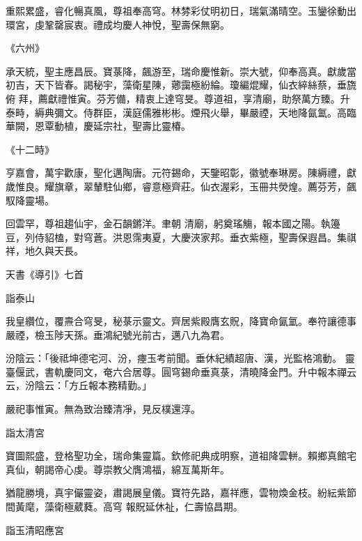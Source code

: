 \begin{pinyinscope}
 重熙累盛，睿化暢真風，尊祖奉高穹。林棼彩仗明初日，瑞氣滿晴空。玉鑾徐動出環宮，虔鞏罄宸衷。禮成均慶人神悅，聖壽保無窮。



 《六州》



 承天統，聖主應昌辰。寶菉降，飆游至，瑞命慶惟新。崇大號，仰奉高真。獻歲當初吉，天下皆春。謁秘宇，藻衛星陳，薌靄極紛綸。瓊編焜耀，仙衣綷絲蔡，垂旒俯
 拜，薦獻禮惟寅。芬芳備，精衷上達穹旻。尊道祖，享清廟，助祭萬方臻。升泰畤，縟典彌文。侍群臣，漢庭儒雅彬彬。煙飛火舉，畢嚴禋，天地降氤氳。高臨華闕，恩覃動植，慶延宗社，聖壽比靈椿。



 《十二時》



 亨嘉會，萬宇歡康，聖化邁陶唐。元符錫命，天鑒昭彰，徽號奉琳房。陳縟禮，獻歲惟良。耀旗章，翠輦駐仙鄉，睿意極齊莊。仙衣渥彩，玉冊共熒煌。薦芬芳，飆馭降靈場。



 回雲罕，尊祖趨仙宇，金石韻鏘洋。聿朝
 清廟，躬奠瑤觴，報本國之陽。執籩豆，列侍貂榼，對穹蒼。洪恩霈夷夏，大慶浹家邦。垂衣紫極，聖壽保遐昌。集祺祥，地久與天長。



 天書《導引》七首



 詣泰山



 我皇纘位，覆燾合穹旻，秘菉示靈文。齊居紫殿膺玄貺，降寶命氤氳。奉符讓德事嚴禋，檢玉陟天孫。垂鴻紀號光前古，邁八九為君。



 汾陰云：「後祗坤德宅河、汾，瘞玉考前聞。垂休紀績超唐、漢，光監格鴻動。
 靈臺偃武，書軌慶同文，奄六合居尊。圓穹錫命垂真菉，清曉降金門。升中報本禪云云，汾陰云：「方丘報本務精勤。」



 嚴祀事惟寅。無為致治臻清凈，見反樸還淳。



 詣太清宮



 寶圖熙盛，登格聖功全，瑞命集靈篇。欽修祀典成明察，道祖降雲軿。賴鄉真館宅真仙，朝謁帝心虔。尊崇教父膺鴻福，綿亙萬斯年。



 猶龍勝境，真宇儼靈姿，肅謁展皇儀。寶符先路，嘉祥應，雲物煥金枝。紛紜紫節間黃麾，藻衛極葳蕤。高穹
 報貺延休祉，仁壽協昌期。



 詣玉清昭應宮




\end{pinyinscope}
